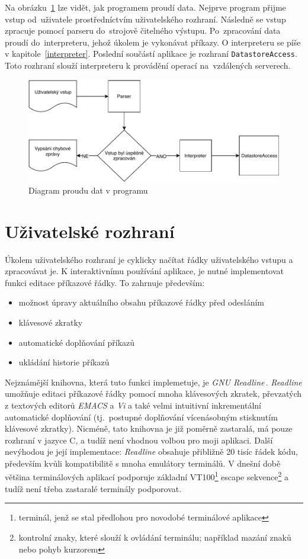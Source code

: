 \documentclass[thesis=B,czech,hidelinks]{FITthesis}[2019/03/06]
\begin{document}
Na obrázku~\ref{proud:dat} lze vidět, jak programem proudí data. Nejprve program přijme vstup od~uživatele prostředníctvím uživatelského rozhraní. Následně se vstup zpracuje pomocí parseru do~strojově čitelného výstupu. Po~zpracování data proudí do~interpreteru, jehož úkolem je vykonávat příkazy. O interpreteru se píše v kapitole~\ref{interpreter}. Poslední součástí aplikace je rozhraní \texttt{DatastoreAccess}. Toto rozhraní slouží interpreteru k provádění operací na~vzdálených serverech.
\begin{figure}
\begin{center}
\includegraphics[width=.9\textwidth]{diagram}
\end{center}
\caption{Diagram proudu dat v programu}\label{proud:dat}
\end{figure}


\section{Uživatelské rozhraní}\label{ui}
Úkolem uživatelského rozhraní je cyklicky načítat řádky uživatelského vstupu a zpracovávat je. K interaktivnímu používání aplikace, je nutné implementovat funkci editace příkazové řádky. To zahrnuje především:
\begin{itemize}
    \item možnost úpravy aktuálního obsahu příkazové řádky před odesláním
    \item klávesové zkratky
    \item automatické doplňování příkazů
    \item ukládání historie příkazů
\end{itemize}

Nejznámější knihovna, která tuto funkci implemetuje, je \textit{GNU Readline}\,\cite{readline}. \textit{Readline} umožňuje editaci příkazové řádky pomocí mnoha klávesových zkratek, převzatých z textových editorů \textit{EMACS} a \textit{Vi} a také velmi intuitivní inkrementální automatické doplňování (tj.\ postupné doplňování vícenásobným stisknutím klávesové zkratky). Nicméně, tato knihovna je již poměrně zastaralá, má pouze rozhraní v jazyce C, a tudíž není vhodnou volbou pro moji aplikaci. Další nevýhodou je její implementace: \textit{Readline} obsahuje přibližně 20 tisíc řádek kódu, především kvůli kompatibilitě s mnoha emulátory terminálů. V dnešní době většina terminálových aplikací podporuje základní VT100\footnote{terminál, jenž se stal předlohou pro novodobé terminálové aplikace} escape sekvence\footnote{kontrolní znaky, které slouží k ovládání terminálu; například mazání znaků nebo pohyb kurzorem} a tudíž není třeba zastaralé terminály podporovat.\cite{linenoise-readme}
\end{document}
